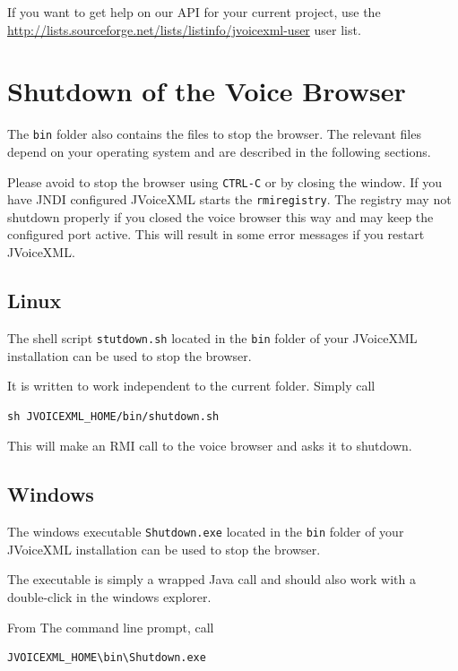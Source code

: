 \documentclass[11pt,a4paper]{book}
\begin{document}
If you want to get help on our API for your current project, use the
\url{http://lists.sourceforge.net/lists/listinfo/jvoicexml-user} user list.

\section{Shutdown of the Voice Browser}

The \texttt{bin} folder also contains the files to stop the browser. The
relevant files depend on your operating system and are described in the following
sections.

Please avoid to stop the browser using \lstinline{CTRL-C} or by closing the
window. If you have JNDI configured JVoiceXML starts the \lstinline{rmiregistry}.
The registry may not shutdown properly if you closed the voice browser this way
and may keep the configured port active. This will result in some error messages
if you restart JVoiceXML.


\subsection{Linux}

The shell script \texttt{stutdown.sh} located in the \texttt{bin} folder
of your JVoiceXML installation can be used to stop the browser.

It is written to work independent to the current folder. Simply call

\begin{lstlisting}
sh JVOICEXML_HOME/bin/shutdown.sh
\end{lstlisting}

This will make an RMI call to the voice browser and asks it to shutdown.

\subsection{Windows}

The windows executable \texttt{Shutdown.exe} located in the \texttt{bin}
folder of your JVoiceXML installation can be used to stop the browser.

The executable is simply a wrapped Java call and should also work with a
double-click in the windows explorer.

From The command line prompt, call

\begin{lstlisting}
JVOICEXML_HOME\bin\Shutdown.exe
\end{lstlisting}
\end{document}
